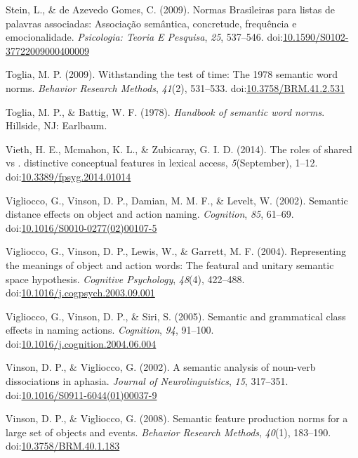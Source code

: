 \documentclass[english,,man]{apa6}
\theoremstyle{definition}
\theoremstyle{definition}
\theoremstyle{definition}
\theoremstyle{remark}
\begin{document}
\leavevmode\hypertarget{ref-Stein2009}{}%
Stein, L., \& de Azevedo Gomes, C. (2009). Normas Brasileiras para
listas de palavras associadas: Associação semântica, concretude,
frequência e emocionalidade. \emph{Psicologia: Teoria E Pesquisa},
\emph{25}, 537--546.
doi:\href{https://doi.org/10.1590/S0102-37722009000400009}{10.1590/S0102-37722009000400009}

\leavevmode\hypertarget{ref-Toglia2009}{}%
Toglia, M. P. (2009). Withstanding the test of time: The 1978 semantic
word norms. \emph{Behavior Research Methods}, \emph{41}(2), 531--533.
doi:\href{https://doi.org/10.3758/BRM.41.2.531}{10.3758/BRM.41.2.531}

\leavevmode\hypertarget{ref-Toglia1978}{}%
Toglia, M. P., \& Battig, W. F. (1978). \emph{Handbook of semantic word
norms}. Hillside, NJ: Earlbaum.

\leavevmode\hypertarget{ref-Vieth2014}{}%
Vieth, H. E., Mcmahon, K. L., \& Zubicaray, G. I. D. (2014). The roles
of shared vs . distinctive conceptual features in lexical access,
\emph{5}(September), 1--12.
doi:\href{https://doi.org/10.3389/fpsyg.2014.01014}{10.3389/fpsyg.2014.01014}

\leavevmode\hypertarget{ref-Vigliocco2002}{}%
Vigliocco, G., Vinson, D. P., Damian, M. M. F., \& Levelt, W. (2002).
Semantic distance effects on object and action naming. \emph{Cognition},
\emph{85}, 61--69.
doi:\href{https://doi.org/10.1016/S0010-0277(02)00107-5}{10.1016/S0010-0277(02)00107-5}

\leavevmode\hypertarget{ref-Vigliocco2004}{}%
Vigliocco, G., Vinson, D. P., Lewis, W., \& Garrett, M. F. (2004).
Representing the meanings of object and action words: The featural and
unitary semantic space hypothesis. \emph{Cognitive Psychology},
\emph{48}(4), 422--488.
doi:\href{https://doi.org/10.1016/j.cogpsych.2003.09.001}{10.1016/j.cogpsych.2003.09.001}

\leavevmode\hypertarget{ref-Vigliocco2005}{}%
Vigliocco, G., Vinson, D. P., \& Siri, S. (2005). Semantic and
grammatical class effects in naming actions. \emph{Cognition},
\emph{94}, 91--100.
doi:\href{https://doi.org/10.1016/j.cognition.2004.06.004}{10.1016/j.cognition.2004.06.004}

\leavevmode\hypertarget{ref-Vinson2002}{}%
Vinson, D. P., \& Vigliocco, G. (2002). A semantic analysis of noun-verb
dissociations in aphasia. \emph{Journal of Neurolinguistics}, \emph{15},
317--351.
doi:\href{https://doi.org/10.1016/S0911-6044(01)00037-9}{10.1016/S0911-6044(01)00037-9}

\leavevmode\hypertarget{ref-Vinson2008}{}%
Vinson, D. P., \& Vigliocco, G. (2008). Semantic feature production
norms for a large set of objects and events. \emph{Behavior Research
Methods}, \emph{40}(1), 183--190.
doi:\href{https://doi.org/10.3758/BRM.40.1.183}{10.3758/BRM.40.1.183}
\end{document}
